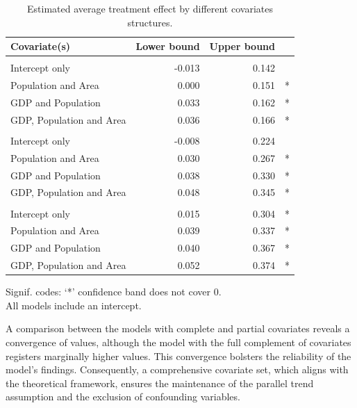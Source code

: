 \documentclass[12pt, a4paper, twoside]{article}
\numberwithin{equation}{subsection} %
\begin{document}
\hypertarget{tbl-other-models}{}
\begingroup
\fontsize{9.0pt}{10.8pt}\selectfont
\setlength{\LTpost}{0mm}
\begin{longtable}{lrrr}
\caption{\label{tbl-other-models}Estimated average treatment effect by different covariates structures. }\tabularnewline

\toprule
Covariate(s) & Lower bound & Upper bound &   \\ 
\midrule\addlinespace[2.5pt]
\multicolumn{4}{l}{Group} \\[2.5pt] 
\midrule\addlinespace[2.5pt]
Intercept only & -0.013 & 0.142 &  \\ 
Population and Area & 0.000 & 0.151 & * \\ 
GDP and Population & 0.033 & 0.162 & * \\ 
GDP, Population and Area & 0.036 & 0.166 & * \\ 
\midrule\addlinespace[2.5pt]
\multicolumn{4}{l}{Dynamic} \\[2.5pt] 
\midrule\addlinespace[2.5pt]
Intercept only & -0.008 & 0.224 &  \\ 
Population and Area & 0.030 & 0.267 & * \\ 
GDP and Population & 0.038 & 0.330 & * \\ 
GDP, Population and Area & 0.048 & 0.345 & * \\ 
\midrule\addlinespace[2.5pt]
\multicolumn{4}{l}{Calendar-time} \\[2.5pt] 
\midrule\addlinespace[2.5pt]
Intercept only & 0.015 & 0.304 & * \\ 
Population and Area & 0.039 & 0.337 & * \\ 
GDP and Population & 0.040 & 0.367 & * \\ 
GDP, Population and Area & 0.052 & 0.374 & * \\ 
\bottomrule
\end{longtable}
\begin{minipage}{\linewidth}
Signif. codes: `*' confidence band does not cover 0.\\
All models include an intercept.\\
\end{minipage}
\endgroup

A comparison between the models with complete and partial covariates
reveals a convergence of values, although the model with the full
complement of covariates registers marginally higher values. This
convergence bolsters the reliability of the model's findings.
Consequently, a comprehensive covariate set, which aligns with the
theoretical framework, ensures the maintenance of the parallel trend
assumption and the exclusion of confounding variables.
\end{document}
